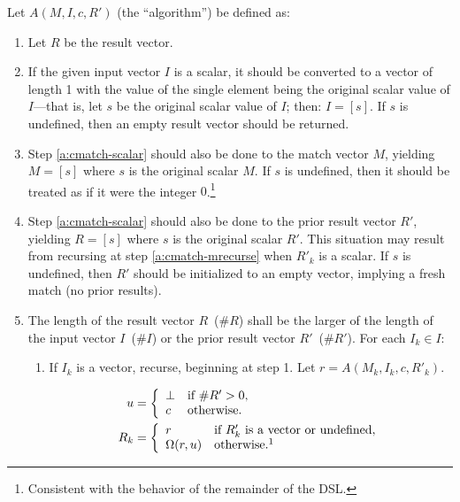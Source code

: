 Let $A\!\left(M,I,c,R'\right)$ (the ``algorithm'') be defined as:

\begin{enumerate}
  \item
  Let $R$ be the result vector.

  \item\label{a:cmatch-scalar}
  If the given input vector $I$ is a scalar, it should be converted to a vector
  of length 1 with the value of the single element being the original scalar
  value of $I$---that is, let $s$ be the original scalar value of $I$; then: $I
  = \left[ s \right]$. If $s$ is undefined, then an empty result vector should
  be returned.

  \item\label{a:cmatch:input-vectorize}
  Step \ref{a:cmatch-scalar} should also be done to the match vector $M$,
  yielding $M = \left[ s \right]$ where $s$ is the original scalar $M$. If $s$
  is undefined, then it should be treated as if it were the integer
  $0$.\footnote{Consistent with the behavior of the remainder of the DSL.}

  \item
  Step \ref{a:cmatch-scalar} should also be done to the prior result vector
  $R'$, yielding $R = \left[ s \right]$ where $s$ is the original scalar $R'$.
  This situation may result from recursing at step \ref{a:cmatch-mrecurse} when
  $R'_k$ is a scalar. If $s$ is undefined, then $R'$ should be initialized to an
  empty vector, implying a fresh match (no prior results).
  \goodbreak

  \item\label{a:cmatch-iter}
  The length of the result vector $R$~($\#R$) shall be the larger of the length
  of the input vector $I$~($\#I$) or the prior result vector $R'$~($\#R'$).
  For each $I_k \in I$:

  \begin{enumerate}
    \item\label{a:cmatch-mrecurse}
    If $I_k$ is a vector, recurse, beginning at step 1. Let $r =
    A(M_k,I_k,c,R'_k)$.

    \begin{align*}
      u &= \left\{
        \begin{array}{ll}
          \bot & \textrm{if }\#R' > 0, \\
          c    & \textrm{otherwise.}
        \end{array}
      \right. \\
      R_k &= \left\{
        \begin{array}{ll}
          r & \textrm{if $R'_k$ is a vector or undefined}, \\
          \Omega(r,u) & \textrm{otherwise}.\footnotemark
        \end{array}
      \right.
    \end{align*}


\end{enumerate}
\end{enumerate}

